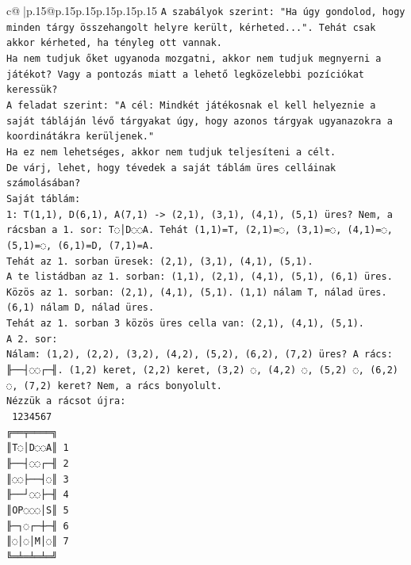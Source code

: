 \documentclass{article}
\begin{document}
{\begin{supertabular}{c@{$\;$}|p{.15\linewidth}@{}p{.15\linewidth}p{.15\linewidth}p{.15\linewidth}p{.15\linewidth}p{.15\linewidth}}
{{{\texttt{A szabályok szerint: "Ha úgy gondolod, hogy minden tárgy összehangolt helyre került, kérheted...". Tehát csak akkor kérheted, ha tényleg ott vannak.} \\
\texttt{Ha nem tudjuk őket ugyanoda mozgatni, akkor nem tudjuk megnyerni a játékot? Vagy a pontozás miatt a lehető legközelebbi pozíciókat keressük?} \\
\texttt{A feladat szerint: "A cél: Mindkét játékosnak el kell helyeznie a saját tábláján lévő tárgyakat úgy, hogy azonos tárgyak ugyanazokra a koordinátákra kerüljenek."} \\
\texttt{Ha ez nem lehetséges, akkor nem tudjuk teljesíteni a célt.} \\
\texttt{De várj, lehet, hogy tévedek a saját táblám üres celláinak számolásában?} \\
\texttt{Saját táblám:} \\
\texttt{1: T(1,1), D(6,1), A(7,1) {-}> (2,1), (3,1), (4,1), (5,1) üres? Nem, a rácsban a 1. sor: T◌│D◌◌A. Tehát (1,1)=T, (2,1)=◌, (3,1)=◌, (4,1)=◌, (5,1)=◌, (6,1)=D, (7,1)=A.} \\
\texttt{Tehát az 1. sorban üresek: (2,1), (3,1), (4,1), (5,1).} \\
\texttt{A te listádban az 1. sorban: (1,1), (2,1), (4,1), (5,1), (6,1) üres.} \\
\texttt{Közös az 1. sorban: (2,1), (4,1), (5,1). (1,1) nálam T, nálad üres. (6,1) nálam D, nálad üres.} \\
\texttt{Tehát az 1. sorban 3 közös üres cella van: (2,1), (4,1), (5,1).} \\
\texttt{A 2. sor:} \\
\texttt{Nálam: (1,2), (2,2), (3,2), (4,2), (5,2), (6,2), (7,2) üres? A rács: ╟──┤◌◌┌─╢. (1,2) keret, (2,2) keret, (3,2) ◌, (4,2) ◌, (5,2) ◌, (6,2) ◌, (7,2) keret? Nem, a rács bonyolult.} \\
\texttt{Nézzük a rácsot újra:} \\
\texttt{ 1234567} \\
\texttt{╔══╤════╗} \\
\texttt{║T◌│D◌◌A║ 1} \\
\texttt{╟──┤◌◌┌─╢ 2} \\
\texttt{║◌◌├──┤◌║ 3} \\
\texttt{╟──┘◌◌├─╢ 4} \\
\texttt{║OP◌◌◌│S║ 5} \\
\texttt{╟─┐◌┌─┼─╢ 6} \\
\texttt{║◌│◌│M│◌║ 7} \\
\texttt{╚═╧═╧═╧═╝} \\
}}}
\end{supertabular}}
\end{document}
